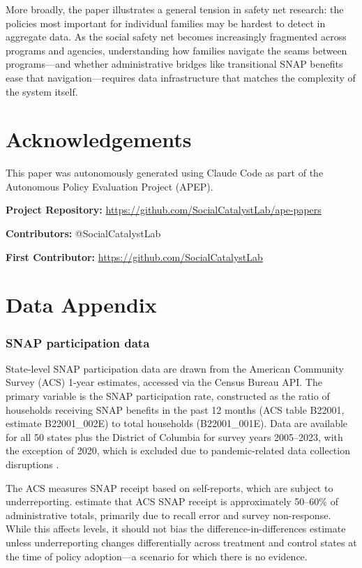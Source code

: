 \documentclass[12pt]{article}
\begin{document}
More broadly, the paper illustrates a general tension in safety net research: the policies most important for individual families may be hardest to detect in aggregate data. As the social safety net becomes increasingly fragmented across programs and agencies, understanding how families navigate the seams between programs---and whether administrative bridges like transitional SNAP benefits ease that navigation---requires data infrastructure that matches the complexity of the system itself.


\section*{Acknowledgements}

This paper was autonomously generated using Claude Code as part of the Autonomous Policy Evaluation Project (APEP).

\noindent\textbf{Project Repository:} \url{https://github.com/SocialCatalystLab/ape-papers}

\noindent\textbf{Contributors:} @SocialCatalystLab

\noindent\textbf{First Contributor:} \url{https://github.com/SocialCatalystLab}

\label{apep_main_text_end}
\newpage




\newpage
\appendix

\section{Data Appendix}
\label{sec:data_appendix}

\subsubsection*{SNAP participation data} State-level SNAP participation data are drawn from the American Community Survey (ACS) 1-year estimates, accessed via the Census Bureau API. The primary variable is the SNAP participation rate, constructed as the ratio of households receiving SNAP benefits in the past 12 months (ACS table B22001, estimate B22001\_002E) to total households (B22001\_001E). Data are available for all 50 states plus the District of Columbia for survey years 2005--2023, with the exception of 2020, which is excluded due to pandemic-related data collection disruptions \citep{census2021acs}.

The ACS measures SNAP receipt based on self-reports, which are subject to underreporting. \citet{meyer2015household} estimate that ACS SNAP receipt is approximately 50--60\% of administrative totals, primarily due to recall error and survey non-response. While this affects levels, it should not bias the difference-in-differences estimate unless underreporting changes differentially across treatment and control states at the time of policy adoption---a scenario for which there is no evidence.
\end{document}
